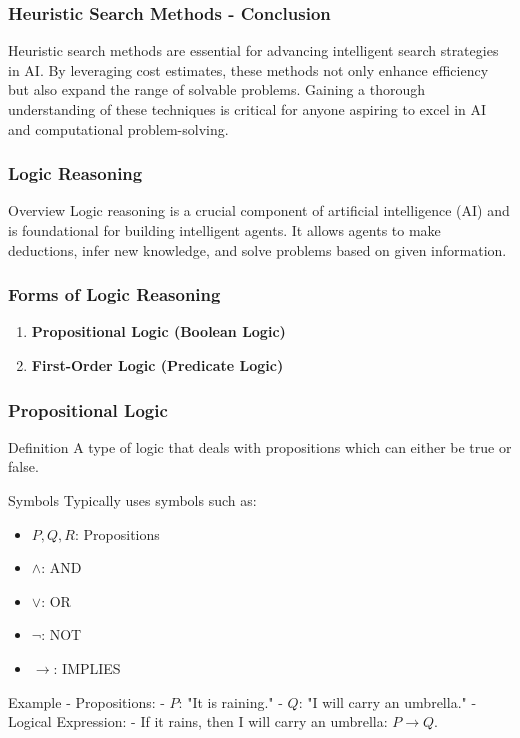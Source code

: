 \documentclass[aspectratio=169]{beamer}
\begin{document}
\begin{frame}[fragile]
    \frametitle{Heuristic Search Methods - Conclusion}
    Heuristic search methods are essential for advancing intelligent search strategies in AI. By leveraging cost estimates, these methods not only enhance efficiency but also expand the range of solvable problems. Gaining a thorough understanding of these techniques is critical for anyone aspiring to excel in AI and computational problem-solving.
\end{frame}

\begin{frame}[fragile]
    \frametitle{Logic Reasoning}
    \begin{block}{Overview}
        Logic reasoning is a crucial component of artificial intelligence (AI) and is foundational for building intelligent agents. It allows agents to make deductions, infer new knowledge, and solve problems based on given information.
    \end{block}
\end{frame}

\begin{frame}[fragile]
    \frametitle{Forms of Logic Reasoning}
    \begin{enumerate}
        \item \textbf{Propositional Logic (Boolean Logic)}
        \item \textbf{First-Order Logic (Predicate Logic)}
    \end{enumerate}
\end{frame}

\begin{frame}[fragile]
    \frametitle{Propositional Logic}
    \begin{block}{Definition}
        A type of logic that deals with propositions which can either be true or false.
    \end{block}
    
    \begin{block}{Symbols}
        Typically uses symbols such as:
        \begin{itemize}
            \item $P, Q, R$: Propositions
            \item $\land$: AND
            \item $\lor$: OR
            \item $\neg$: NOT
            \item $\rightarrow$: IMPLIES
        \end{itemize}
    \end{block}

    \begin{block}{Example}
        - Propositions:
          - $P$: "It is raining."
          - $Q$: "I will carry an umbrella."
        - Logical Expression:
          - If it rains, then I will carry an umbrella: $P \rightarrow Q$.
    \end{block}
\end{frame}
\end{document}
